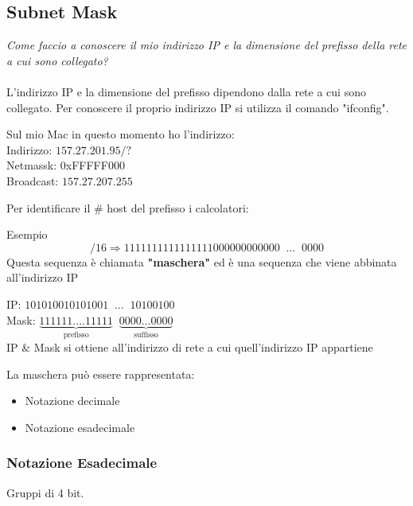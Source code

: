 \documentclass[a4paper]{article}
\begin{document}
\subsection{Subnet Mask}

\textit{Come faccio a conoscere il mio indirizzo IP e la dimensione del prefisso della rete a cui sono collegato? }
\\\\
L'indirizzo IP e la dimensione del prefisso dipendono dalla rete a cui sono collegato.
Per conoscere il proprio indirizzo IP si utilizza il comando "ifconfig".
\begin{center}
Sul mio Mac in questo momento ho l'indirizzo:\\
Indirizzo: $157.27.201.95/?$\\
Netmassk: 0xFFFFF000\\
Broadcast: $157.27.207.255$
\end{center}
Per identificare il $\#$ host del prefisso i calcolatori:
\begin{examplebox}{Esempio}
\[/16 \Longrightarrow 1111 1111 1111 1111 0000 0000 0000 \; \; ... \; \; 0000\]
Questa sequenza è chiamata \textbf{"maschera"} ed è una sequenza che viene abbinata all'indirizzo IP
\begin{center}
    IP: $101010010101001 \; \; ... \; \; 10100100$
    \\
    Mask: $\underbrace{111111 .... 11111}_{\text{prefisso}}\; \; \underbrace{0000 ... 0000}_{\text{suffisso}}$ \\
    IP $\&$ Mask si ottiene all'indirizzo di rete a cui quell'indirizzo IP appartiene
\end{center}
\end{examplebox}
La maschera può essere rappresentata:
\begin{itemize}
    \item Notazione decimale
    \item Notazione esadecimale
\end{itemize}

\subsubsection{Notazione Esadecimale}

Gruppi di 4 bit.
\end{document}
